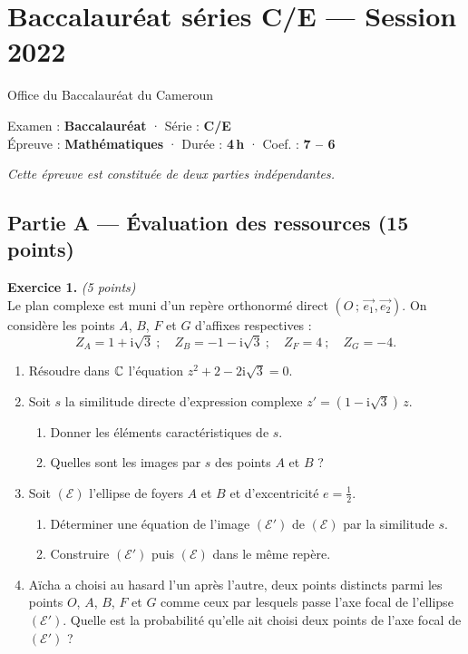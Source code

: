 \section{Baccalauréat séries C/E — Session 2022}
\noindent\begin{minipage}{0.5\linewidth}\footnotesize Office du Baccalauréat du Cameroun\end{minipage}%
\hfill\begin{minipage}{0.45\linewidth}\footnotesize\raggedleft Examen : \textbf{Baccalauréat} · Série : \textbf{C/E}\\
Épreuve : \textbf{Mathématiques} · Durée : \textbf{4\,h} · Coef. : \textbf{7 -- 6}\end{minipage}
\par\smallskip{\color{onbo}\rule{\linewidth}{1pt}}

\noindent\textit{Cette épreuve est constituée de deux parties indépendantes.}

\subsection*{Partie A — Évaluation des ressources \hfill (15 points)}

\noindent\textbf{Exercice 1.} \hfill\textit{(5 points)}\\
Le plan complexe est muni d'un repère orthonormé direct $(O\,;\,\vec{e_1},\vec{e_2})$. On
considère les points $A$, $B$, $F$ et $G$ d'affixes respectives :
\[ Z_A=1+\mathrm{i}\sqrt3\ ;\quad Z_B=-1-\mathrm{i}\sqrt3\ ;\quad Z_F=4\ ;\quad Z_G=-4. \]
\begin{enumerate}[label=\arabic*)]
\item Résoudre dans $\mathbb{C}$ l'équation $z^2+2-2\mathrm{i}\sqrt3=0$.
\item Soit $s$ la similitude directe d'expression complexe $z'=(1-\mathrm{i}\sqrt3)\,z$.
  \begin{enumerate}[label=\textbf{\alph*.}]
  \item Donner les éléments caractéristiques de $s$.
  \item Quelles sont les images par $s$ des points $A$ et $B$ ?
  \end{enumerate}
\item Soit $(\mathcal{E})$ l'ellipse de foyers $A$ et $B$ et d'excentricité $e=\frac12$.
  \begin{enumerate}[label=\textbf{\alph*.}]
  \item Déterminer une équation de l'image $(\mathcal{E}')$ de $(\mathcal{E})$ par la similitude $s$.
  \item Construire $(\mathcal{E}')$ puis $(\mathcal{E})$ dans le même repère.
  \end{enumerate}
\item Aïcha a choisi au hasard l'un après l'autre, deux points distincts parmi les points
  $O$, $A$, $B$, $F$ et $G$ comme ceux par lesquels passe l'axe focal de l'ellipse $(\mathcal{E}')$.
  Quelle est la probabilité qu'elle ait choisi deux points de l'axe focal de $(\mathcal{E}')$ ?
\end{enumerate}

